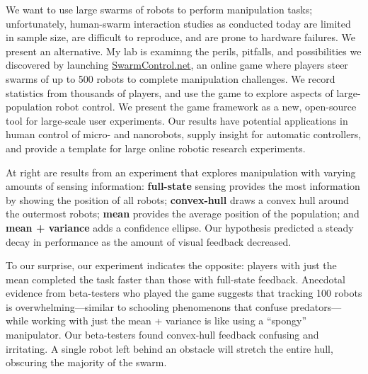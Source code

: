 \documentclass{article}
\begin{document}
We want to use large swarms of robots to perform manipulation tasks; unfortunately, human-swarm interaction studies as conducted today are limited in sample size, are difficult to reproduce, and are prone to hardware failures. We present an alternative.
My lab is examinng the perils, pitfalls, and possibilities we discovered by launching \href{http://www.swarmcontrol.net}{SwarmControl.net}, an online game where players steer swarms of up to 500 robots to complete manipulation challenges. We record statistics from thousands of players, and use the game to explore aspects of large-population robot control. We present the game framework as a new, open-source tool for large-scale user experiments. Our results have potential applications in human control of micro- and nanorobots, supply insight for automatic controllers, and provide a template for large online robotic research experiments.

At right are results from an experiment that  explores manipulation with varying amounts of sensing information: {\bf full-state} sensing provides the most information by showing the position of all robots; {\bf convex-hull} draws a convex hull around the outermost robots; {\bf mean} provides the average position of the population; and {\bf mean + variance} adds a confidence ellipse. Our hypothesis predicted a steady decay in performance as the amount of visual feedback decreased.

To our surprise, our experiment indicates the opposite: players  with just the mean completed the task faster than those with full-state feedback.    Anecdotal evidence from beta-testers who played the game suggests that tracking 100 robots is overwhelming---similar to schooling phenomenons that confuse predators---while working with just the mean + variance is like using a ``spongy'' manipulator. Our beta-testers found convex-hull feedback confusing and irritating.  A single robot left behind an obstacle will stretch the entire hull, obscuring the majority of the swarm.

%
\end{document}
